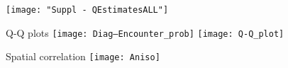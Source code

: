 \documentclass[xcolor=x11names,compress]{beamer}
\renewcommand{\(}{\begin{columns}}
\renewcommand{\)}{\end{columns}}
\newcommand{\<}[1]{\begin{column}{#1}}
\renewcommand{\>}{\end{column}}
\begin{document}
\begin{frame}
\centering
\texttt{[image: "Suppl - QEstimatesALL"]}

\end{frame}

\begin{frame}{Q-Q plots}
\centering
\texttt{[image: Diag--Encounter\_prob]}
\texttt{[image: Q-Q\_plot]}

\end{frame}

\begin{frame}{Spatial correlation}
	\centering
\texttt{[image: Aniso]}
\end{frame}


\end{document}
